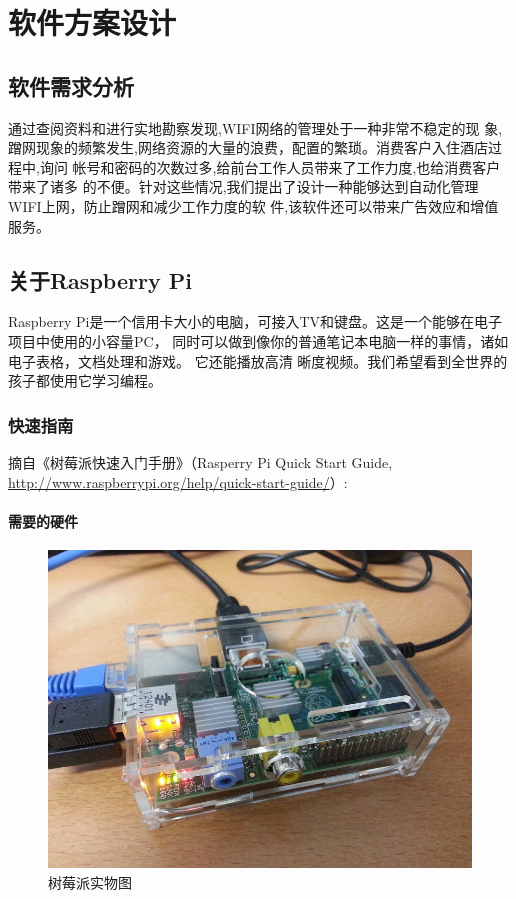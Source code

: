 \chapter{软件方案设计}

\section{软件需求分析}

通过查阅资料和进行实地勘察发现,WIFI网络的管理处于一种非常不稳定的现
象,蹭网现象的频繁发生,网络资源的大量的浪费，配置的繁琐。消费客户入住酒店过程中,询问
帐号和密码的次数过多,给前台工作人员带来了工作力度,也给消费客户带来了诸多
的不便。针对这些情况,我们提出了设计一种能够达到自动化管理WIFI上网，防止蹭网和减少工作力度的软
件,该软件还可以带来广告效应和增值服务。

\section{关于Raspberry Pi}

Raspberry Pi是一个信用卡大小的电脑，可接入TV和键盘。这是一个能够在电子项目中使用的小容量PC，
同时可以做到像你的普通笔记本电脑一样的事情，诸如电子表格，文档处理和游戏。 它还能播放高清
晰度视频。我们希望看到全世界的孩子都使用它学习编程\cite{pie}。

\subsection{快速指南}
摘自《树莓派快速入门手册》（Rasperry Pi Quick Start Guide,
\url{http://www.raspberrypi.org/help/quick-start-guide/}）:

\subsubsection{需要的硬件}

\begin{figure}[h]
  \centering
  \includegraphics[width=.6\textwidth]{pic/real}
  \caption{树莓派实物图}
  \label{fig:real}
\end{figure}

